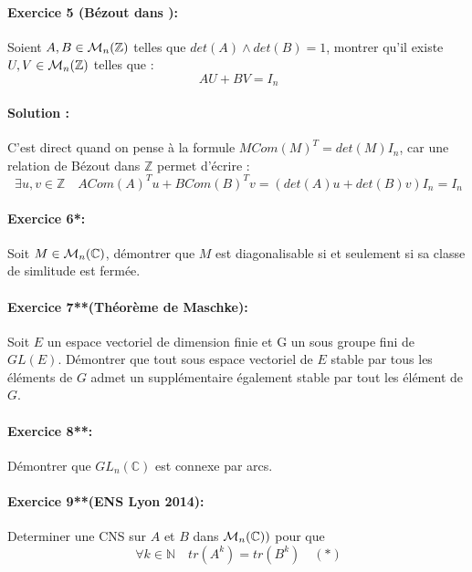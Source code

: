 \documentclass[letterpaper,10pt]{article}
\begin{document}
\paragraph{Exercice 5 (Bézout dans ):}
Soient $A,B \in \mathcal{M}_n(\mathbb{Z})$ telles que $ det(A) \wedge det(B) = 1$, montrer qu'il
existe $U,V \in \mathcal{M}_n(\mathbb{Z})$ telles que : \[\ AU+BV = I_n\]

\paragraph{Solution :}

C'est direct quand on pense à la formule $MCom(M)^{T}= det(M)I_n$,
car une relation de Bézout dans $\mathbb{Z}$ permet d'écrire : \[\ 
\exists u,v \in \mathbb{Z} \quad ACom(A)^{T}u + BCom(B)^Tv = (det(A)u+det(B)v)I_n = I_n
\]
\paragraph{Exercice 6*:}
Soit $M \in \mathcal{M}_n(\mathbb{C})$, démontrer que $M$ est diagonalisable si et seulement si
sa classe de simlitude est fermée.

\paragraph{Exercice 7**(Théorème de Maschke):}
Soit $E$ un espace vectoriel de dimension finie et G un sous groupe fini de 
$GL(E)$. Démontrer que tout sous espace vectoriel de $E$ stable par tous les éléments de $G$ admet un 
supplémentaire également stable par tout les élément de $G$.

\paragraph{Exercice 8**:} Démontrer que $GL_n(\mathbb{C})$ est connexe par
 arcs.

\paragraph{Exercice 9**(ENS Lyon 2014):}

Determiner une CNS sur $A$ et $B$ dans $\mathcal{M}_n(\mathbb{C}))$ pour que \[\
\forall k \in \mathbb{N} \quad tr(A^k) = tr(B^k) \quad (*) \]
\end{document}
